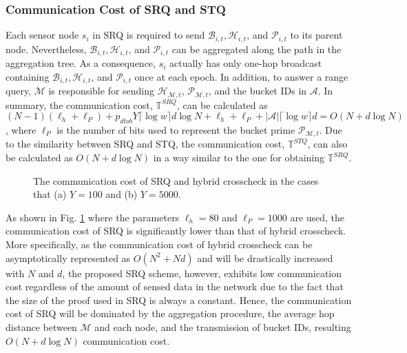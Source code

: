 \documentclass[conference]{IEEEtran}
\begin{document}
\subsubsection{Communication Cost of SRQ and STQ} Each sensor node $s_i$ in SRQ is required to send $\mathcal{B}_{i,t},\mathcal{H}_{i,t}$, and $\mathcal{P}_{i,t}$ to its parent node. Nevertheless, $\mathcal{B}_{i,t},\mathcal{H}_{i,t}$, and $\mathcal{P}_{i,t}$ can be aggregated along the path in the aggregation tree. As a consequence, $s_i$ actually has only one-hop broadcast containing $\mathcal{B}_{i,t},\mathcal{H}_{i,t}$, and $\mathcal{P}_{i,t}$ once at each epoch. In addition, to answer a range query, $\mathcal{M}$ is responsible for sending $\mathcal{H}_{\mathcal{M},t}$, $\mathcal{P}_{\mathcal{M},t}$, and the bucket IDs in $\mathcal{A}$. In summary, the communication cost, $\mathbb{T}^{SRQ}$, can be calculated as $(N-1)(\ell_h+\ell_P)+p_{dtob}Y\lceil\log w\rceil d\log N+\ell_h+\ell_P+|\mathcal{A}|\lceil\log w\rceil d=O(N+d\log N)$, where $\ell_P$ is the number of bits used to represent the bucket prime $\mathcal{P}_{\mathcal{M},t}$. Due to the similarity between SRQ and STQ, the communication cost, $\mathbb{T}^{STQ}$, can also be calculated as $O(N+d\log N)$ in a way similar to the one for obtaining $\mathbb{T}^{SRQ}$.

\begin{figure}[h]
\centering
{}
\caption{\scriptsize The communication cost of SRQ and hybrid crosscheck in the cases that (a) $Y=100$ and (b) $Y=5000$.} \label{fig: communication cost}
\end{figure}

As shown in Fig. \ref{fig: communication cost} where the parameters $\ell_h=80$ and $\ell_P=1000$ are used, the communication cost of SRQ is significantly lower than that of hybrid crosscheck. More specifically, as the communication cost of hybrid crosscheck can be asymptotically represented as $O(N^2+Nd)$ and will be drastically increased with $N$ and $d$, the proposed SRQ scheme, however, exhibits low communication cost regardless of the amount of sensed data in the network due to the fact that the size of the proof used in SRQ is always a constant. Hence, the communication cost of SRQ will be dominated by the aggregation procedure, the average hop distance between $\mathcal{M}$ and each node, and the transmission of bucket IDs, resulting $O(N+d\log N)$ communication cost.
\end{document}
